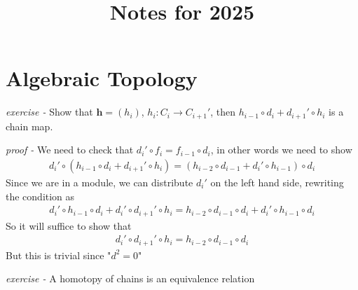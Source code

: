\documentclass[11pt]{article}
\title{Notes for 2025}
\theoremstyle{definition}
\begin{document}
    \maketitle

    \section{Algebraic Topology}
    
    \emph{exercise - } Show that \(\mathbf{h} = (h_i)\), \(h_i: C_i \to C_{i+1}'\), then \(h_{i-1}\circ d_i + d_{i+1}' \circ h_i\) is a chain map.

    \emph{proof - } We need to check that \(d_i' \circ f_i = f_{i-1} \circ d_i\), in other words we need to show
    \begin{align*}
        d_i' \circ (h_{i-1}\circ d_i + d_{i+1}' \circ h_i) = (h_{i-2}\circ d_{i-1} + d_{i}' \circ h_{i-1})\circ d_i
    \end{align*}
    Since we are in a module, we can distribute \(d_i'\) on the left hand side, rewriting the condition as
    \begin{align*}
        d_i' \circ h_{i-1}\circ d_i + d_i' \circ d_{i+1}' \circ h_i = h_{i-2}\circ d_{i-1}\circ d_i + d_{i}' \circ h_{i-1}\circ d_i
    \end{align*}
    So it will suffice to show that
    \begin{align*}
        d_i' \circ d_{i+1}' \circ h_i = h_{i-2}\circ d_{i-1}\circ d_i
    \end{align*}
    But this is trivial since "\(d^2 = 0\)"

    \emph{exercise - } A homotopy of chains is an equivalence relation
\end{document}
